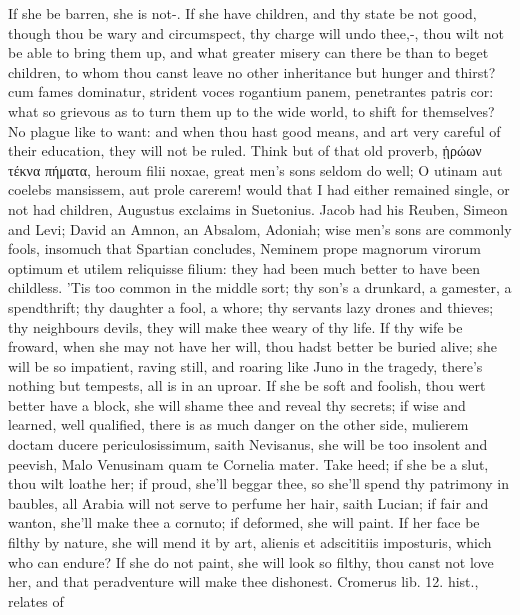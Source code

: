 If she be barren, she is not-\etc{}. If she have children, and thy
state be not good, though thou be wary and circumspect, thy charge will
undo thee,-, thou wilt not be
able to bring them up, and what greater misery can there be than
to beget children, to whom thou canst leave no other inheritance but
hunger and thirst? cum fames dominatur, strident voces rogantium
panem, penetrantes patris cor: what so grievous as to turn them up to
the wide world, to shift for themselves? No plague like to want: and
when thou hast good means, and art very careful of their education,
they will not be ruled. Think but of that old proverb, ᾑρώων τέκνα
πήματα, heroum filii noxae, great men's sons seldom do well; O utinam
aut coelebs mansissem, aut prole carerem! would that I had either
remained single, or not had children, Augustus exclaims in
Suetonius. Jacob had his Reuben, Simeon and Levi; David an Amnon, an
Absalom, Adoniah; wise men's sons are commonly fools, insomuch that
Spartian concludes, Neminem prope magnorum virorum optimum et utilem
reliquisse filium: they had been much better to have been
childless. 'Tis too common in the middle sort; thy son's a drunkard, a
gamester, a spendthrift; thy daughter a fool, a whore; thy servants
lazy drones and thieves; thy neighbours devils, they will make thee
weary of thy life. If thy wife be froward, when she may not have
her will, thou hadst better be buried alive; she will be so impatient,
raving still, and roaring like Juno in the tragedy, there's nothing but
tempests, all is in an uproar. If she be soft and foolish, thou wert
better have a block, she will shame thee and reveal thy secrets; if
wise and learned, well qualified, there is as much danger on the other
side, mulierem doctam ducere periculosissimum, saith Nevisanus, she
will be too insolent and peevish, Malo Venusinam quam te Cornelia
mater. Take heed; if she be a slut, thou wilt loathe her; if proud,
she'll beggar thee, so she'll spend thy patrimony in baubles, all
Arabia will not serve to perfume her hair, saith Lucian; if fair and
wanton, she'll make thee a cornuto; if deformed, she will paint.
If her face be filthy by nature, she will mend it by art, alienis
et adscititiis imposturis, which who can endure? If she do not paint,
she will look so filthy, thou canst not love her, and that peradventure
will make thee dishonest. Cromerus lib. 12. hist., relates of

